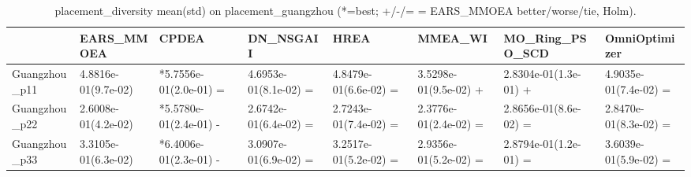 \begin{table}[t]
\centering
\caption{placement_diversity mean(std) on placement_guangzhou (*=best; +/-/= = EARS_MMOEA better/worse/tie, Holm).}
\label{tab:placement_guangzhou_placement_diversity}
\begin{tabular}{llllllll}
\toprule
 & EARS\_MMOEA & CPDEA & DN\_NSGAII & HREA & MMEA\_WI & MO\_Ring\_PSO\_SCD & OmniOptimizer \\
\midrule
Guangzhou\_p11 & 4.8816e-01(9.7e-02) & *5.7556e-01(2.0e-01) = & 4.6953e-01(8.1e-02) = & 4.8479e-01(6.6e-02) = & 3.5298e-01(9.5e-02) + & 2.8304e-01(1.3e-01) + & 4.9035e-01(7.4e-02) = \\
Guangzhou\_p22 & 2.6008e-01(4.2e-02) & *5.5780e-01(2.4e-01) - & 2.6742e-01(6.4e-02) = & 2.7243e-01(7.4e-02) = & 2.3776e-01(2.4e-02) = & 2.8656e-01(8.6e-02) = & 2.8470e-01(8.3e-02) = \\
Guangzhou\_p33 & 3.3105e-01(6.3e-02) & *6.4006e-01(2.3e-01) - & 3.0907e-01(6.9e-02) = & 3.2517e-01(5.2e-02) = & 2.9356e-01(5.2e-02) = & 2.8794e-01(1.2e-01) = & 3.6039e-01(5.9e-02) = \\
\bottomrule
\end{tabular}
\end{table}

